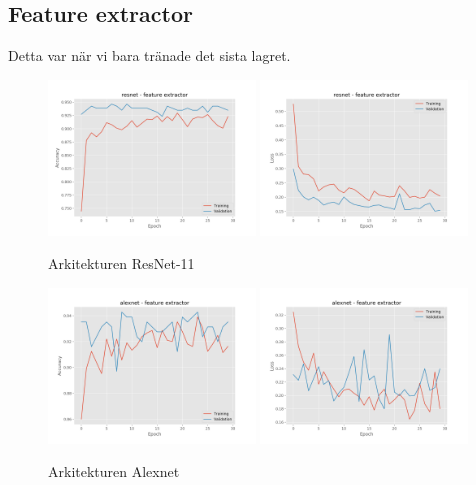 \documentclass{kththesis}
\begin{document}
    \subsection{Feature extractor}
    Detta var när vi bara tränade det sista lagret.

    \begin{figure}
      \centering
      \includegraphics[width=0.49\textwidth]{"./balcony/balcony-20split - acc - resnet - feature extractor"}
      \includegraphics[width=0.49\textwidth]{"./balcony/balcony-20split - loss - resnet - feature extractor"}
      \caption{Arkitekturen ResNet-11}
    \end{figure}

    \begin{figure}
      \centering
      \includegraphics[width=0.49\textwidth]{"./balcony/balcony-20split - acc - alexnet - feature extractor"}
      \includegraphics[width=0.49\textwidth]{"./balcony/balcony-20split - loss - alexnet - feature extractor"}
      \caption{Arkitekturen Alexnet}
    \end{figure}
\end{document}
